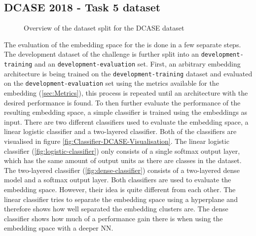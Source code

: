 \subsection{DCASE 2018 - Task 5 dataset}
\label{sub:Eval-DCASE}
\begin{figure}[ht]
    \centering
\caption{Overview of the dataset split for the DCASE dataset}
\label{fig:DCASE-split}
\end{figure}
\noindent
The evaluation of the embedding space for the  is done in a few separate steps. The development dataset of the challenge is further split into an \texttt{development-training} and an \texttt{development-evaluation} set. First, an arbitrary embedding architecture is being trained on the \texttt{development-training} dataset and evaluated on the \texttt{development-evaluation} set using the metrics available for the embedding (\ref{sec:Metrics}), this process is repeated until an architecture with the desired performance is found.
\newline
\newline
To then further evaluate the performance of the resulting embedding space, a simple classifier is trained using the embeddings as input. There are two different classifiers used to evaluate the embedding space, a linear logistic classifier and a two-layered classifier. Both of the classifiers are visualised in figure \ref{fig:Classifier-DCASE-Visualisation}.
\newline
\newline
The linear logistic classifier (\ref{fig:logistic-classifier}) only consists of a single softmax output layer, which has the same amount of output units as there are classes in the dataset. The two-layered classifier (\ref{fig:dense-classifier}) consists of a two-layered dense model and a softmax output layer. Both classifiers are used to evaluate the embedding space. However, their idea is quite different from each other. The linear classifier tries to separate the embedding space using a hyperplane and therefore shows how well separated the embedding clusters are. The dense classifier shows how much of a performance gain there is when using the embedding space with a deeper \gls{NN}.
